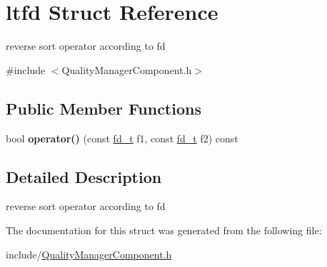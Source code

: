 \hypertarget{structltfd}{}\section{ltfd Struct Reference}
\label{structltfd}


reverse sort operator according to fd  




{\ttfamily \#include $<$Quality\+Manager\+Component.\+h$>$}

\subsection*{Public Member Functions}
\begin{DoxyCompactItemize}
\item 
\mbox{\label{structltfd_a4b7eb54c1de2870c5b34fc6f73827a4f}} 
bool {\bfseries operator()} (const \hyperlink{structfd__t}{fd\+\_\+t} f1, const \hyperlink{structfd__t}{fd\+\_\+t} f2) const
\end{DoxyCompactItemize}


\subsection{Detailed Description}
reverse sort operator according to fd 

The documentation for this struct was generated from the following file\+:\begin{DoxyCompactItemize}
\item 
include/\hyperlink{QualityManagerComponent_8h}{Quality\+Manager\+Component.\+h}\end{DoxyCompactItemize}
